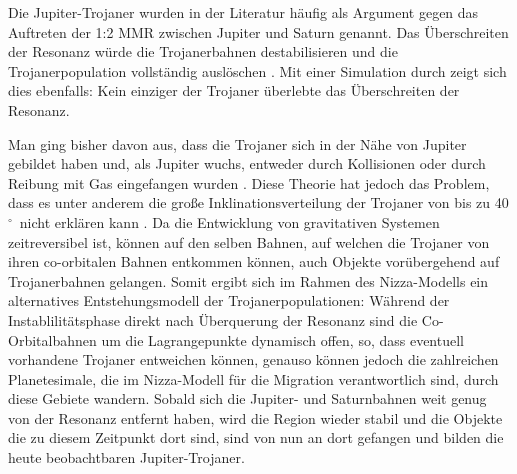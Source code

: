 \documentclass[12pt,a4paper,twoside,open=right,bibliography=totoc]{scrbook}
\renewcommand{\cite}{ \citep}
\newcommand{\degree}{$^\circ$}
\begin{document}
Die Jupiter-Trojaner wurden in der Literatur häufig als Argument gegen das Auftreten der 1:2 MMR zwischen Jupiter und Saturn genannt. Das Überschreiten der Resonanz würde die Trojanerbahnen destabilisieren und die Trojanerpopulation vollständig auslöschen\cite{Gomes1998,Michtchenko2001,Morbidelli2005}.
Mit einer Simulation durch \cite{Morbidelli2005} zeigt sich dies ebenfalls: Kein einziger der Trojaner überlebte das Überschreiten der Resonanz.

Man ging bisher davon aus, dass die Trojaner sich in der Nähe von Jupiter gebildet haben und, als Jupiter wuchs, entweder durch Kollisionen oder durch Reibung mit Gas eingefangen wurden\cite{Yoder1979Icar,Shoemaker1989aste,Peale1993Icar,Kary1995Icar,Marzari1998Icar,Fleming2000Icar,Kortenkamp2001DPS,Morbidelli2005}. 
Diese Theorie hat jedoch das Problem, dass es unter anderem die große Inklinationsverteilung der Trojaner von bis zu 40\degree\ nicht erklären kann\cite{Marzari2002,Morbidelli2005}.
Da die Entwicklung von gravitativen Systemen zeitreversibel ist, können auf den selben Bahnen,
auf welchen die Trojaner von ihren co-orbitalen Bahnen entkommen können, auch Objekte vorübergehend auf Trojanerbahnen gelangen.
Somit ergibt sich im Rahmen des Nizza-Modells ein alternatives Entstehungsmodell der Trojanerpopulationen: Während der Instablilitätsphase direkt nach Überquerung der Resonanz sind die Co-Orbitalbahnen um die Lagrangepunkte dynamisch offen, so, dass eventuell vorhandene Trojaner entweichen können, genauso können jedoch die zahlreichen Planetesimale, die im Nizza-Modell für die Migration verantwortlich sind, durch diese Gebiete wandern.
Sobald sich die Jupiter- und Saturnbahnen weit genug von der Resonanz entfernt haben, wird die Region wieder stabil und die Objekte die zu diesem Zeitpunkt dort sind, sind von nun an dort gefangen und bilden die heute beobachtbaren Jupiter-Trojaner.
\end{document}
